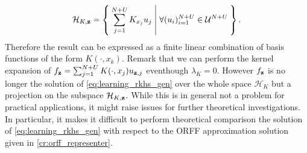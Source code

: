\begin{dmath*}
\mathcal{H}_{K, \seq{z}}=\Set{\sum_{j=1}^{N+U}K_{x_j}u_j| \forall (u_i)_{i=1}^{N+U} \in\mathcal{U}^{N+U}}.
\end{dmath*}
Therefore the result can be expressed as a finite linear combination of basis functions of the form $K(\cdot,x_k)$. Remark that we can perform the kernel expansion of $f_{\boldsymbol{\mathbf{z}}}=\sum_{j=1}^{N+U}K(\cdot,x_j)u_{\boldsymbol{\mathbf{z}},j}$ eventhough $\lambda_K=0$. However $f_{\boldsymbol{\mathbf{z}}}$ is no longer the solution of \cref{eq:learning_rkhs_gen} over the whole space $\mathcal{H}_K$ but a projection on the subspace $\mathcal{H}_{K, \boldsymbol{\mathbf{z}}}$. While this is in general not a problem for practical applications, it might raise issues for further theoretical investigations. In particular, it makes it difficult to perform theoretical comparison the  solution of \cref{eq:learning_rkhs_gen} with respect to the \acs{ORFF} approximation solution given in \cref{cr:orff_representer}.
